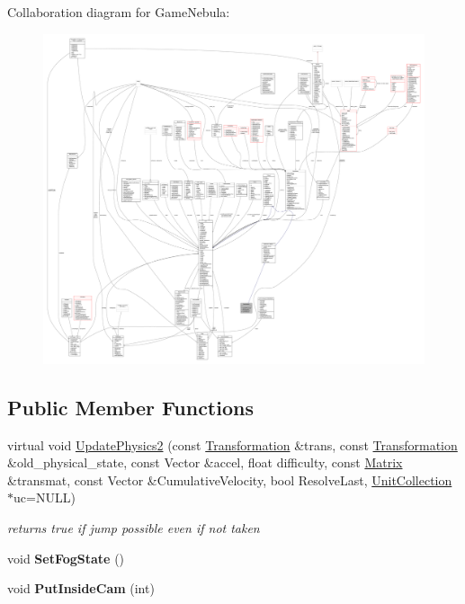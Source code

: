 Collaboration diagram for Game\+Nebula\+:
\nopagebreak
\begin{figure}[H]
\begin{center}
\leavevmode
\includegraphics[width=350pt]{de/dbb/classGameNebula__coll__graph}
\end{center}
\end{figure}
\subsection*{Public Member Functions}
\begin{DoxyCompactItemize}
\item 
virtual void \hyperlink{classGameNebula_a3028dccb3764fba45b25990d1a31d8bb}{Update\+Physics2} (const \hyperlink{structTransformation}{Transformation} \&trans, const \hyperlink{structTransformation}{Transformation} \&old\+\_\+physical\+\_\+state, const Vector \&accel, float difficulty, const \hyperlink{classMatrix}{Matrix} \&transmat, const Vector \&Cumulative\+Velocity, bool Resolve\+Last, \hyperlink{classUnitCollection}{Unit\+Collection} $\ast$uc=N\+U\+LL)
\begin{DoxyCompactList}\small\item\em returns true if jump possible even if not taken \end{DoxyCompactList}\item 
void {\bfseries Set\+Fog\+State} ()\hypertarget{classGameNebula_a2c891cc71cb3522489ecd5180373af62}{}\label{classGameNebula_a2c891cc71cb3522489ecd5180373af62}

\item 
void {\bfseries Put\+Inside\+Cam} (int)\hypertarget{classGameNebula_a0077bafd00f793becd01f30837dc2d56}{}\label{classGameNebula_a0077bafd00f793becd01f30837dc2d56}

\end{DoxyCompactItemize}
